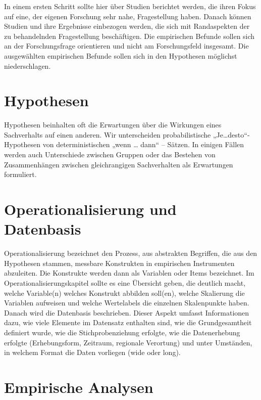 \documentclass[
  12pt,
]{article}
\begin{document}
In einem ersten Schritt sollte hier über Studien berichtet werden, die
ihren Fokus auf eine, der eigenen Forschung sehr nahe, Fragestellung
haben. Danach können Studien und ihre Ergebnisse einbezogen werden, die
sich mit Randaspekten der zu behandelnden Fragestellung beschäftigen.
Die empirischen Befunde sollen sich an der Forschungsfrage orientieren
und nicht am Forschungsfeld insgesamt. Die ausgewählten empirischen
Befunde sollen sich in den Hypothesen möglichst niederschlagen.

\hypertarget{hypothesen}{%
\section{Hypothesen}\label{hypothesen}}

Hypothesen beinhalten oft die Erwartungen über die Wirkungen eines
Sachverhalts auf einen anderen. Wir unterscheiden probabilistische
„Je\ldots desto``- Hypothesen von deterministischen „wenn \ldots{}
dann`` -- Sätzen. In einigen Fällen werden auch Unterschiede zwischen
Gruppen oder das Bestehen von Zusammenhängen zwischen gleichrangigen
Sachverhalten als Erwartungen formuliert.

\hypertarget{operationalisierung-und-datenbasis}{%
\section{Operationalisierung und
Datenbasis}\label{operationalisierung-und-datenbasis}}

Operationalisierung bezeichnet den Prozess, aus abstrakten Begriffen,
die aus den Hypothesen stammen, messbare Konstrukten in empirischen
Instrumenten abzuleiten. Die Konstrukte werden dann als Variablen oder
Items bezeichnet. Im Operationalisierungskapitel sollte es eine
Übersicht geben, die deutlich macht, welche Variable(n) welches
Konstrukt abbilden soll(en), welche Skalierung die Variablen aufweisen
und welche Wertelabels die einzelnen Skalenpunkte haben. Danach wird die
Datenbasis beschrieben. Dieser Aspekt umfasst Informationen dazu, wie
viele Elemente im Datensatz enthalten sind, wie die Grundgesamtheit
definiert wurde, wie die Stichprobenziehung erfolgte, wie die
Datenerhebung erfolgte (Erhebungsform, Zeitraum, regionale Verortung)
und unter Umständen, in welchem Format die Daten vorliegen (wide oder
long).

\hypertarget{empirische-analysen}{%
\section{Empirische Analysen}\label{empirische-analysen}}
\end{document}
